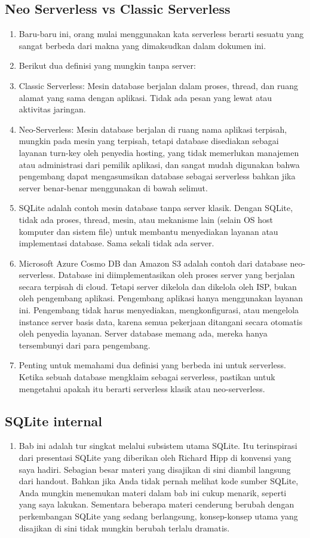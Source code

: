 \begin{enumerate}
	\subsection{Neo Serverless vs Classic Serverless}
		\begin{enumerate}
			\item Baru-baru ini, orang mulai menggunakan kata serverless berarti sesuatu yang sangat berbeda dari makna yang dimaksudkan dalam dokumen ini. 
			\item Berikut dua definisi yang mungkin tanpa server:
			\item Classic Serverless: Mesin database berjalan dalam proses, thread, dan ruang alamat yang sama dengan aplikasi. Tidak ada pesan yang lewat atau aktivitas jaringan.
			\item Neo-Serverless: Mesin database berjalan di ruang nama aplikasi terpisah, mungkin pada mesin yang terpisah, tetapi database disediakan sebagai layanan turn-key oleh penyedia hosting, yang tidak memerlukan manajemen atau administrasi dari pemilik aplikasi, dan sangat mudah digunakan bahwa pengembang dapat mengasumsikan database sebagai serverless bahkan jika server benar-benar menggunakan di bawah selimut.
			\item SQLite adalah contoh mesin database tanpa server klasik. Dengan SQLite, tidak ada proses, thread, mesin, atau mekanisme lain (selain OS host komputer dan sistem file) untuk membantu menyediakan layanan atau implementasi database. Sama sekali tidak ada server.
			\item Microsoft Azure Cosmo DB dan Amazon S3 adalah contoh dari database neo-serverless. Database ini diimplementasikan oleh proses server yang berjalan secara terpisah di cloud. Tetapi server dikelola dan dikelola oleh ISP, bukan oleh pengembang aplikasi. Pengembang aplikasi hanya menggunakan layanan ini. Pengembang tidak harus menyediakan, mengkonfigurasi, atau mengelola instance server basis data, karena semua pekerjaan ditangani secara otomatis oleh penyedia layanan. Server database memang ada, mereka hanya tersembunyi dari para pengembang.
			\item Penting untuk memahami dua definisi yang berbeda ini untuk serverless. Ketika sebuah database mengklaim sebagai serverless, pastikan untuk mengetahui apakah itu berarti serverless klasik atau neo-serverless.
		\end{enumerate}
	\subsection{SQLite internal}
	\begin{enumerate}
	\item Bab ini adalah tur singkat melalui subsistem utama SQLite. Itu terinspirasi dari presentasi SQLite yang diberikan oleh Richard Hipp di konvensi yang saya hadiri. Sebagian besar materi yang disajikan di sini diambil langsung dari handout. Bahkan jika Anda tidak pernah melihat kode sumber SQLite, Anda mungkin menemukan materi dalam bab ini cukup menarik, seperti yang saya lakukan. Sementara beberapa materi cenderung berubah dengan perkembangan SQLite yang sedang berlangsung, konsep-konsep utama yang disajikan di sini tidak mungkin berubah terlalu dramatis.
	\end{enumerate}

\end{enumerate}
